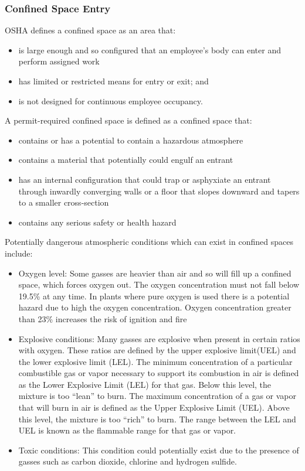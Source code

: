 \subsubsection{Confined Space Entry}
OSHA defines a confined space as an area that:
\begin{itemize} 
\item is large enough and so configured that an employee's body can enter and perform assigned work
\item has limited or restricted means for entry or exit; and
\item is not designed for continuous employee occupancy.
\end{itemize}
A permit-required confined space is defined as a confined space that:
\begin{itemize} 
\item contains or has a potential to contain a hazardous atmosphere
\item contains a material that potentially could engulf an entrant
\item has an internal configuration that could trap or asphyxiate an entrant through inwardly converging walls or a floor that slopes downward and tapers to a smaller cross-section
\item contains any serious safety or health hazard
\end{itemize}

Potentially dangerous atmospheric conditions which can exist in confined spaces include: 
\begin{itemize}
\item Oxygen level: Some gasses are heavier than air and so will fill up a confined space, which forces oxygen out.  The oxygen concentration must not fall below 19.5\% at any time.  In plants where pure oxygen is used there is a potential hazard due to high the oxygen concentration.  Oxygen concentration greater than 23\% increases the risk of ignition and fire
\item Explosive conditions:  Many gasses are explosive when present in certain ratios with oxygen. These ratios are defined by the upper explosive limit(UEL) and the lower explosive limit (LEL).  The minimum concentration of a particular combustible gas or vapor necessary to support its combustion in air is defined as the Lower Explosive Limit (LEL) for that gas. Below this level, the mixture is too “lean” to burn. The maximum concentration of a gas
or vapor that will burn in air is defined as the Upper Explosive Limit (UEL). Above this level, the mixture is too “rich” to burn.  The range between the LEL and UEL is known as the flammable range for that gas or vapor.  
\item Toxic conditions:  This condition could potentially exist due to the presence of gasses such as carbon dioxide, chlorine and hydrogen sulfide.  
\end{itemize}